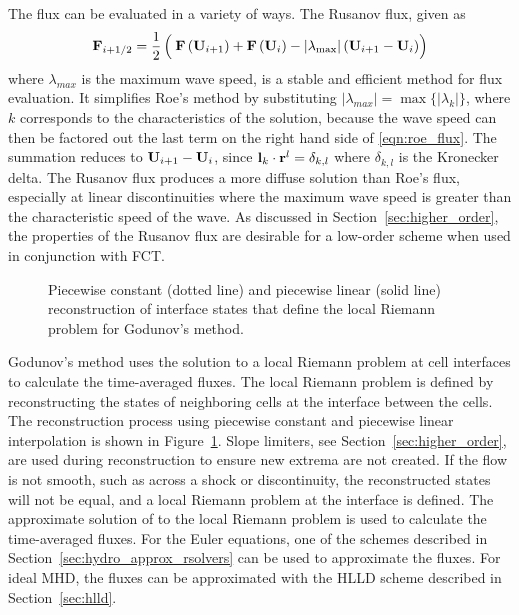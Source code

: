 The flux can be evaluated in a variety of ways.  The Rusanov flux, given as
\begin{gather}
\label{eqn:rusanov}
\mbf{F}_{i+1/2} = \half\left(\phantom{\frac{}{}}\mbf{F}\left(\mbf{U}_{i+1}\right) + \mbf{F}\left(\mbf{U}_{i}\right)
            - |\lambda_{\max}|\left(\mbf{U}_{i+1} - \mbf{U}_{i} \right) \right)
\end{gather}
where $\lambda_{max}$ is the maximum wave speed, is a stable and efficient method for flux evaluation.  It simplifies Roe's method by substituting $|\lambda_{max}| = \max\{|\lambda_k|\}$, where $k$ corresponds to the characteristics of the solution, because the wave speed can then be factored out the last term on the right hand side of \eqref{eqn:roe_flux}.  The summation reduces to $\mathbf{U}_{i+1} - \mathbf{U}_{i}$, since $\mathbf{l}_k\cdot\mathbf{r}^l = \delta_{k,l}$ where $\delta_{k,l}$ is the Kronecker delta.  The Rusanov flux produces a more diffuse solution than Roe's flux, especially at linear discontinuities where the maximum wave speed is greater than the characteristic speed of the wave.  As discussed in Section~\ref{sec:higher_order}, the properties of the Rusanov flux are desirable for a low-order scheme when used in conjunction with FCT.  

\begin{figure}[htbp]\figSpace
\begin{center}

\end{center}
\caption{Piecewise constant (dotted line) and piecewise linear (solid line) reconstruction of interface states that define the local Riemann problem for Godunov's method.}
\label{fig:interface}
\figSpace
\end{figure}

Godunov's method uses the solution to a local Riemann problem at cell interfaces to calculate the time-averaged fluxes.  The local Riemann problem is defined by reconstructing the states of neighboring cells at the interface between the cells.  The reconstruction process using piecewise constant and piecewise linear interpolation is shown in Figure~\ref{fig:interface}.  Slope limiters, see Section~\ref{sec:higher_order}, are used during reconstruction to ensure new extrema are not created.  If the flow is not smooth, such as across a shock or discontinuity, the reconstructed states will not be equal, and a local Riemann problem at the interface is defined.  The approximate solution of to the local Riemann problem is used to calculate the time-averaged fluxes.  For the Euler equations, one of the schemes described in Section~\ref{sec:hydro_approx_rsolvers} can be used to approximate the fluxes.  For ideal MHD, the fluxes can be approximated with the HLLD scheme described in Section~\ref{sec:hlld}.  

